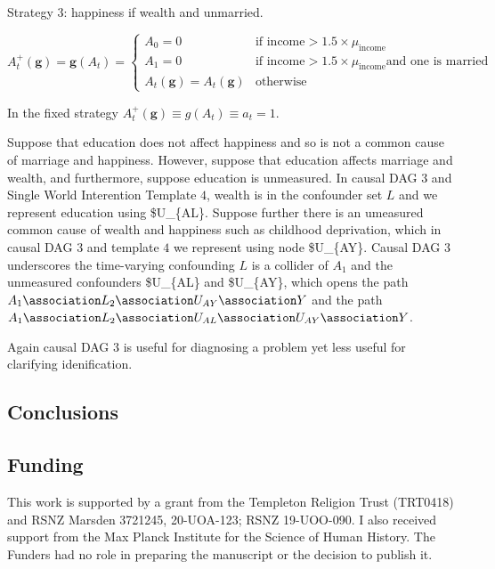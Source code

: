 \documentclass[
  single column]{article}
\begin{document}
Strategy 3: happiness if wealth and unmarried.

\[
A_t^{+}(\mathbf{g}) = \mathbf{g}(A_{t}) = \begin{cases} 
   A_{0} = 0 & \text{if income} > 1.5 \times  \mu_{\text{income}} \\ 
   A_{1} = 0 & \text{if income} > 1.5 \times  \mu_{\text{income}} \text{and one is married} \\ 
   A_{t}(\mathbf{g}) = A_{t}(\mathbf{g}) & \text{otherwise} 
   \end{cases}
\]

In the fixed strategy
\(A_t^{+}(\mathbf{g})  \equiv g(A_t)  \equiv a_t = 1\).

Suppose that education does not affect happiness and so is not a common
cause of marriage and happiness. However, suppose that education affects
marriage and wealth, and furthermore, suppose education is unmeasured.
In causal DAG \(\mathcal{3}\) and Single World Interention Template
\(\mathcal{4}\), wealth is in the confounder set \(L\) and we represent
education using \$U\_\{AL\}. Suppose further there is an umeasured
common cause of wealth and happiness such as childhood deprivation,
which in causal DAG \(\mathcal{3}\) and template \(\mathcal{4}\) we
represent using node \$U\_\{AY\}. Causal DAG \(\mathcal{3}\) underscores
the time-varying confounding \(L\) is a collider of \(A_1\) and the
unmeasured confounders \$U\_\{AL\} and \$U\_\{AY\}, which opens the path
\(A_1 \association L_2 \association U_{AY} \association Y\) and the path
\(A_1 \association L_2 \association U_{AL}\association U_{AY} \association Y\).

Again causal DAG \(\mathcal{3}\) is useful for diagnosing a problem yet
less useful for clarifying idenification.

\subsection{Conclusions}\label{conclusions}

\subsection{Funding}\label{funding}

This work is supported by a grant from the Templeton Religion Trust
(TRT0418) and RSNZ Marsden 3721245, 20-UOA-123; RSNZ 19-UOO-090. I also
received support from the Max Planck Institute for the Science of Human
History. The Funders had no role in preparing the manuscript or the
decision to publish it.
\end{document}
